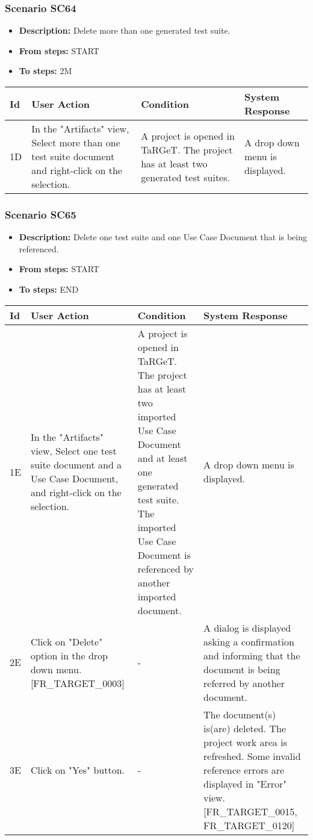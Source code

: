 \documentclass[a4paper,11pt]{article}
\newcommand{\bl}{\\ \hline}
\begin{document}
\subsubsection*{Scenario SC64}
\begin{itemize}
\item {\bf Description:} Delete more than one generated test suite.
				
\item {\bf From steps:} START
\item {\bf To steps:} 2M
\end{itemize}
\begin{tabular}{|p{0.4in}|p{1.5in}|p{1.5in}|p{1.5in}|}
\hline
Id & User Action & Condition & System Response \bl 
1D & In the "Artifacts" view, Select more than one test suite
						document and right-click on the selection.  & A project is opened in TaRGeT. The project has at least
						two generated test suites. & A drop down menu is displayed.\bl
\end{tabular}
\subsubsection*{Scenario SC65}
\begin{itemize}
\item {\bf Description:} Delete one test suite and one Use Case Document that is
					being referenced.
\item {\bf From steps:} START
\item {\bf To steps:} END
\end{itemize}
\begin{tabular}{|p{0.4in}|p{1.5in}|p{1.5in}|p{1.5in}|}
\hline
Id & User Action & Condition & System Response \bl 
1E & In the "Artifacts" view, Select one test suite document and
						a Use Case Document, and right-click on the selection.  & A project is opened in TaRGeT. The project has at least
						two imported Use Case Document and at least one generated test
						suite. The imported Use Case Document is referenced by another
						imported document. & A drop down menu is displayed.\bl
2E & Click on "Delete" option in the drop down menu.
						[FR_TARGET_0003] & - & A dialog is displayed asking a confirmation and informing
						that the document is being referred by another document.
					\bl
3E & Click on "Yes" button. & - & The document(s) is(are) deleted. The project work area is
						refreshed. Some invalid reference errors are displayed in "Error"
						view. [FR_TARGET_0015, FR_TARGET_0120]\bl
\end{tabular}
\end{document}
